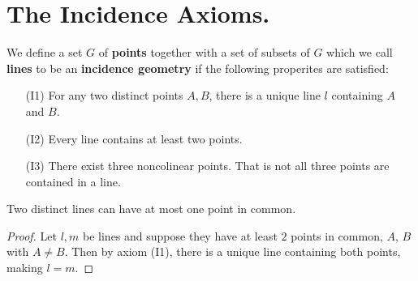 
\section{The Incidence Axioms.}
\label{section1}

\begin{definition}
    We define a set $G$ of \textbf{points} together with a set of subsets of $G$
    which we call  \textbf{lines} to be an \textbf{incidence geometry} if the
    following properites are satisfied:
    \begin{enumerate}
        \item[(I1)] For any two distinct points $A,B$, there is a unique line
            $l$ containing  $A$ and  $B$.

    \item[(I2)] Every line contains at least two points.

    \item[(I3)] There exist three noncolinear points. That is not all three
        points are contained in a line.
    \end{enumerate}
\end{definition}

\begin{proposition}\label{1.1.1}
    Two distinct lines can have at most one point in common.
\end{proposition}
\begin{proof}
    Let $l,m$ be lines and suppose they have at least  $2$ points in common,
    $A$, $B$ with $A \neq B$. Then by axiom  (I1), there is a unique line
    containing both points, making $l=m$.
\end{proof}

